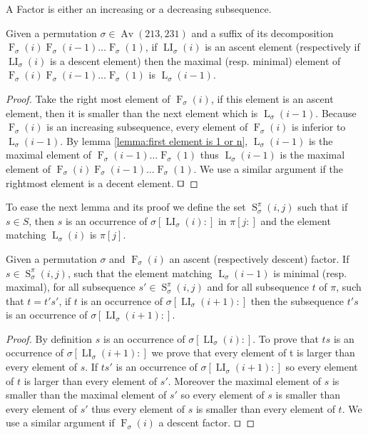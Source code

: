 \documentclass[a4paper]{llncs}
\DeclareMathOperator{\AV}{Av}
\newcommand{\ptext}{\pi}
\newcommand{\pmotif}{\sigma}
\DeclareMathOperator{\firsta}{L}
\newcommand{\first}[2]{\firsta_{{#1}}({#2})}
\DeclareMathOperator{\firstia}{LI}
\newcommand{\firsti}[2]{\firstia_{{#1}}({#2})}
\DeclareMathOperator{\factora}{F}
\newcommand{\factor}[2]{\factora_{{#1}}({#2})}
\DeclareMathOperator{\SETa}{S}
\newcommand{\SET}[4]{\SETa_{{#1}}^{{#2}}({#3},{#4})}
\begin{document}
\begin{remark}
A Factor is either an increasing or a decreasing subsequence.
\end{remark}

\begin{lemma}
\label{lemma:whereIsMax}
Given a permutation $\sigma \in \AV(213,231)$ and a suffix of its decomposition $\factor{\sigma}{i}\factor{\sigma}{i-1}\ldots\factor{\sigma}{1}$, if
$\firsti{\sigma}{i}$ is an ascent element (respectively  if $\firsti{\sigma}{i}$ is a descent element) then the maximal (resp. minimal) element of $\factor{\sigma}{i}\factor{\sigma}{i-1}\ldots\factor{\sigma}{1}$ is $\first{\sigma}{i-1}$.
\end{lemma}

\begin{proof}
Take the right most element of $\factor{\sigma}{i}$, if this element is an ascent element,
then it is smaller than the next element which is $\first{\sigma}{i-1}$. Because $\factor{\sigma}{i}$ is an increasing subsequence, every element of $\factor{\sigma}{i}$ is inferior to $\first{\sigma}{i-1}$.
By lemma \ref{lemma:first element is 1 or n}, $\first{\sigma}{i-1}$ is the maximal element of $\factor{\sigma}{i-1}\ldots\factor{\sigma}{1}$ thus $\first{\sigma}{i-1}$ is the maximal element of $\factor{\sigma}{i}\factor{\sigma}{i-1}\ldots\factor{\sigma}{1}$.
We use a similar argument if the rightmost element is a decent element.
$\qed$
\end{proof}

To ease the next lemma and its proof we define the set $\SET{\pmotif}{\ptext}{i}{j}$ such that if $s \in S$, then $s$ is an occurrence of $\pmotif[\firsti{\pmotif}{i}:]$ in $\ptext[j:]$ and the element matching $\first{\pmotif}{i}$ is $\ptext[j]$.

\begin{lemma}
Given a permutation $\pmotif$ and $\factor{\pmotif}{i}$ an ascent (respectively descent) factor.
If $s \in \SET{\pmotif}{\ptext}{i}{j}$, such that the element matching $\first{\pmotif}{i-1}$ is minimal (resp. maximal), for all subsequence 
$s' \in \SET{\pmotif}{\ptext}{i}{j}$ and for all subsequence $t$ of $\ptext$, such that $t=t's'$, if $t$ is an occurrence of $\pmotif[\firsti{\pmotif}{i+1}:]$ then the subsequence $t's$ is an occurrence of $\pmotif[\firsti{\pmotif}{i+1}:]$.
\end{lemma}

\begin{proof}
By definition $s$ is an occurrence of $\pmotif[\firsti{\pmotif}{i}:]$. To prove that $ts$ is an occurrence of $\pmotif[\firsti{\pmotif}{i+1}:]$ we prove that every element of t is larger than every element of $s$. If $ts'$ is an occurrence of $\pmotif[\firsti{\pmotif}{i+1}:]$ so every element of $t$ is larger than every element of $s'$. Moreover the maximal element of $s$ is smaller than  the maximal element of $s'$ so every element of $s$ is smaller than every element of $s'$ thus every element of $s$ is smaller than every element of $t$. We use a similar argument if $\factor{\pmotif}{i}$ a descent factor.
$\qed$
\end{proof}
\end{document}
